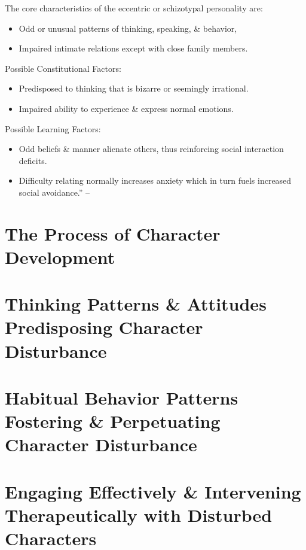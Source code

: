 \documentclass{article}
\numberwithin{equation}{section}
\begin{document}
The core characteristics of the eccentric or schizotypal personality are:
\begin{itemize}
	\item Odd or unusual patterns of thinking, speaking, \& behavior,
	\item Impaired intimate relations except with close family members.
\end{itemize}
Possible Constitutional Factors:
\begin{itemize}
	\item Predisposed to thinking that is bizarre or seemingly irrational.
	\item Impaired ability to experience \& express normal emotions.
\end{itemize}
Possible Learning Factors:
\begin{itemize}
	\item Odd beliefs \& manner alienate others, thus reinforcing social interaction deficits.
	\item Difficulty relating normally increases anxiety which in turn fuels increased social avoidance.'' -- \cite[pp. 104--124]{Simon2011}
\end{itemize}


\section{The Process of Character Development}


\section{Thinking Patterns \& Attitudes Predisposing Character Disturbance}


\section{Habitual Behavior Patterns Fostering \& Perpetuating Character Disturbance}


\section{Engaging Effectively \& Intervening Therapeutically with Disturbed Characters}
\end{document}
